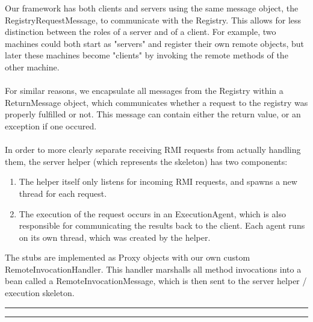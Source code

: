 \documentclass[11pt,letterpaper]{article}
\newcommand{\h}[1]
                    {\vspace{.25in} \hrule\vspace{0.5em}
                    \noindent{\bf #1 \vspace{0.5em}}
                    \hrule \vspace{.10in}
                    }
\begin{document}
Our framework has both clients and servers using the same message object, the RegistryRequestMessage, to communicate with the Registry. This allows for less distinction between the roles of a server and of a client. For example, two machines could both start as "servers" and register their own remote objects, but later these machines become "clients" by invoking the remote methods of the other machine.\\
\\
For similar reasons, we encapsulate all messages from the Registry within a ReturnMessage object, which communicates whether a request to the registry was properly fulfilled or not. This message can contain either the return value, or an exception if one occured.\\
\\
In order to more clearly separate receiving RMI requests from actually handling them, the server helper (which represents the skeleton) has two components:
\begin{enumerate}[1)]
\item The helper itself only listens for incoming RMI requests, and spawns a new thread for each request.
\item The execution of the request occurs in an ExecutionAgent, which is also responsible for communicating the results back to the client. Each agent runs on its own thread, which was created by the helper.
\end{enumerate}

The stubs are implemented as Proxy objects with our own custom RemoteInvocationHandler. This handler marshalls all method invocations into a bean called a RemoteInvocationMessage, which is then sent to the server helper / execution skeleton. 

\h{How to Run}
\end{document}

